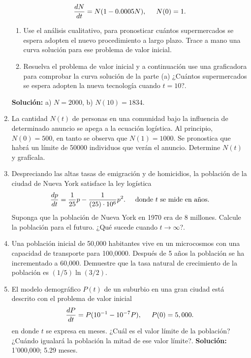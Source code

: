 \documentclass[letterpaper,10pt]{memoir}
\begin{document}
\begin{enumerate}
		\[
			\dfrac{dN}{dt} =N(1- 0.0005N), \hspace{5mm} N(0) =1.
		\]
		\begin{enumerate}
			\item Use el análisis cualitativo, para pronosticar cuántos supermercados se espera adopten el nuevo procedimiento a largo plazo. Trace a mano una curva solución para ese problema de valor inicial.
			\item Resuelva el problema de valor inicial y a continuación use una graficadora para comprobar la curva solución de la parte (a) ¿Cuántos supermercados se espera adopten la nueva tecnología cuando \(t = 10\)?.
		\end{enumerate}
		\textbf{Solución:} a) \(N=2000\), b) \(N(10)=1834\).
	\item La cantidad \(N(t)\) de personas en una comunidad bajo la influencia de determinado anuncio se apega a la ecuación logística. Al principio, \(N(0) = 500\), en tanto se observa que \(N(1) = 1000\). Se pronostica que habrá un límite de 50000 individuos que verán el anuncio. Determine \(N(t)\) y grafícala.
	\item  Despreciando las altas tasas de emigración y de homicidios, la población de la ciudad de Nueva York satisface la ley logística
		\[
			\dfrac{dp}{dt} = \dfrac{1}{25} p- \dfrac{1}{(25) \cdot10^6} p^2. \hspace{5mm} \mbox{donde \(t\) se mide en años.}
		\]
		Suponga que la población de Nueva York en 1970 era de 8 millones. Calcule la población para el futuro. ¿Qué sucede cuando \(t \longrightarrow \infty\)?.
	\item  Una población inicial de 50,000 habitantes vive en un microcosmos con una capacidad de transporte para 100,0000. Después de 5 años la población se ha incrementado a 60,000. Demuestre que la tasa natural de crecimiento de la población es \((1/5) \ln (3/2)\).
	\item  El modelo demográfico \(P(t)\) de un suburbio en una gran ciudad está descrito con el problema de valor inicial
		\[
			\dfrac{dP}{dt} =P(10^{-1} -10^{-7} P), \hspace{5mm} P(0) =5,000.
		\]
		en donde \(t\) se expresa en meses. ¿Cuál es el valor límite de la población? ¿Cuándo igualará la población la mitad de ese valor límite?. \textbf{Solución:} 1’000,000; 5.29 meses.
\end{enumerate}
\end{document}

